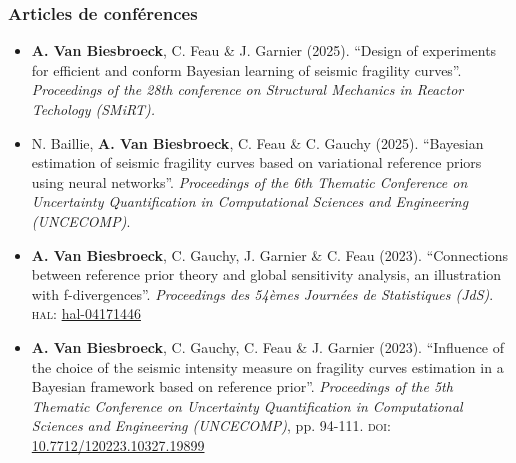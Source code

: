 \subsubsection{Articles de conférences}

\begin{itemize}
    \item \textbf{A. Van Biesbroeck}, C. Feau \& J. Garnier (2025). ``Design of experiments for efficient and conform Bayesian learning of seismic fragility curves''. \emph{Proceedings of the 28th conference on Structural Mechanics in Reactor Techology (SMiRT).}
    \item N. Baillie, \textbf{A. Van Biesbroeck}, C. Feau \& C. Gauchy (2025). ``Bayesian estimation of seismic fragility curves based on variational reference priors using neural networks''. \emph{Proceedings of the 6th Thematic Conference on Uncertainty Quantification in Computational Sciences and Engineering (UNCECOMP)}.
    \item \textbf{A. Van Biesbroeck}, C. Gauchy, J. Garnier \& C. Feau (2023). ``Connections between reference prior theory and global sensitivity analysis, an illustration with f-divergences''. \emph{Proceedings des 54èmes Journées de Statistiques (JdS)}. \textsc{hal:} \href{https://hal.science/hal-04171446}{hal-04171446}
    \item \textbf{A. Van Biesbroeck}, C. Gauchy, C. Feau \& J. Garnier (2023). ``Influence of the choice of the seismic intensity measure on fragility curves estimation in a Bayesian framework based on reference prior''. \emph{Proceedings of the 5th Thematic Conference on Uncertainty Quantification in Computational Sciences and Engineering (UNCECOMP)}, pp. 94-111. \textsc{doi:} \href{https://dx.doi.org/10.7712/120223.10327.19899}{10.7712/120223.10327.19899}
\end{itemize}





